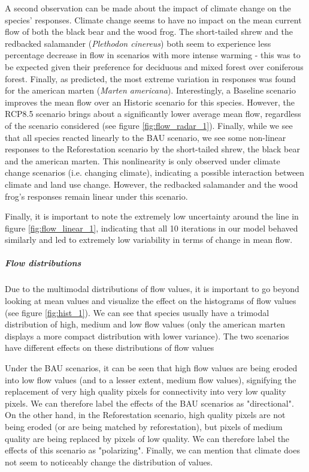 A second observation can be made about the impact of climate change on the species' responses. Climate change seems to have no impact on the mean current flow of both the black bear and the wood frog. The short-tailed shrew and the redbacked salamander (\textit{Plethodon cinereus}) both seem to experience less percentage decrease in flow in scenarios with more intense warming - this was to be expected given their preference for deciduous and mixed forest over coniferous forest. Finally, as predicted, the most extreme variation in responses was  found for the american marten (\textit{Marten americana}). Interestingly, a Baseline scenario improves the mean flow over an Historic scenario for this species. However, the RCP8.5 scenario brings about a significantly lower average mean flow, regardless of the scenario considered (see figure \ref{fig:flow_radar_1}).
Finally, while we see that all species reacted linearly to the BAU scenario, we see some non-linear responses to the Reforestation scenario by the short-tailed shrew, the black bear and the american marten. This nonlinearity is only observed under climate change scenarios (i.e. changing climate), indicating a possible interaction between climate and land use change. However, the redbacked salamander and the wood frog's responses remain linear under this scenario.

Finally, it is important to note the extremely low uncertainty around the line in figure \ref{fig:flow_linear_1}, indicating that all 10 iterations in our model behaved similarly and led to extremely low variability in terms of change in mean flow.

\vspace{1em}

\subparagraph*{\textit{Flow distributions}} Due to the multimodal distributions of flow values, it is important to go beyond looking at mean values and visualize the effect on the histograms of flow values (see figure \ref{fig:hist_1}). We can see that species usually have a trimodal distribution of high, medium and low flow values (only the american marten displays a more compact distribution with lower variance). The two scenarios have different effects on these distributions of flow values

Under the BAU scenarios, it can be seen that high flow values are being eroded into low flow values (and to a lesser extent, medium flow values), signifying the replacement of very high quality pixels for connectivity into very low quality pixels. We can therefore label the effects of the BAU scenarios as "directional". On the other hand, in the Reforestation scenario, high quality pixels are not being eroded (or are being matched by reforestation), but pixels of medium quality are being replaced by pixels of low quality. We can therefore label the effects of this scenario as "polarizing". Finally, we can mention that climate does not seem to noticeably change the distribution of values.

